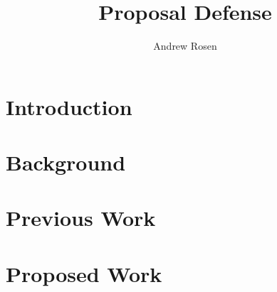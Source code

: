 \documentclass[11pt]{beamer}
\author{Andrew Rosen}
\title{Proposal Defense}
\institute{Georgia State University}
\begin{document}
\maketitle

\begin{frame}
	\frametitle{}
\end{frame}


\section{Introduction}


\section{Background}


\section{Previous Work}

\section{Proposed Work}
\end{document}
